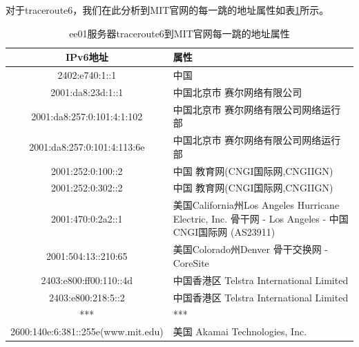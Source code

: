 \documentclass[12pt,letterpaper]{article}
\begin{document}
对于traceroute6，我们在此分析到MIT官网的每一跳的地址属性如表\ref{tab8}所示。
\begin{table}[!h]
	\centering
	\caption{\label{tab8}ee01服务器traceroute6到MIT官网每一跳的地址属性}
	\begin{tabular}{|c|p{10cm}|}
		\hline
		IPv6地址 & 属性 \\
		\hline
		2402:e740:1::1 & 中国 \\
		\hline
		2001:da8:23d:1::1 & 中国北京市 赛尔网络有限公司 \\
		\hline
		2001:da8:257:0:101:4:1:102 & 中国北京市 赛尔网络有限公司网络运行部 \\
		\hline
		2001:da8:257:0:101:4:113:6e &  中国北京市 赛尔网络有限公司网络运行部 \\
		\hline
		2001:252:0:100::2 & 中国 教育网(CNGI国际网,CNGIIGN) \\
		\hline
		2001:252:0:302::2 & 中国 教育网(CNGI国际网,CNGIIGN) \\
		\hline
		2001:470:0:2a2::1 & 美国California州Los Angeles Hurricane Electric, Inc. 骨干网 - Los Angeles - 中国CNGI国际网 (AS23911) \\
		\hline
		2001:504:13::210:65 & 美国Colorado州Denver 骨干交换网 - CoreSite \\
		\hline
		2403:e800:ff00:110::4d & 中国香港区 Telstra International Limited \\
		\hline
		2403:e800:218:5::2 & 中国香港区 Telstra International Limited \\
		\hline
		*** & *** \\
		\hline
		2600:140e:6:381::255e(www.mit.edu) & 美国 Akamai Technologies, Inc. \\
		\hline
	\end{tabular}
\end{table}
\end{document}
